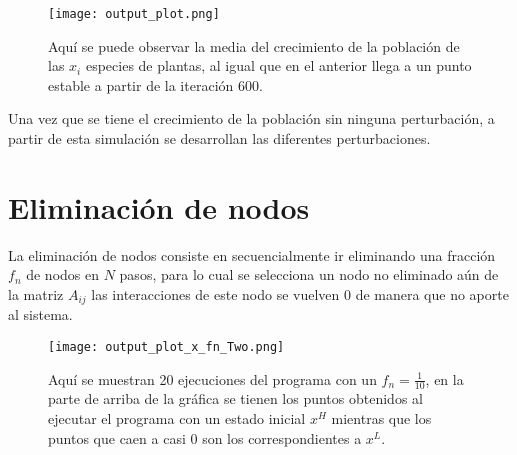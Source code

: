 \documentclass[11pt]{article}
\begin{document}
\begin{figure}[H]
\label{fig-sol}
\texttt{[image: output\_plot.png]}
\caption{Aquí se puede observar la media del crecimiento de la población de las $x_{i}$ especies de plantas, al igual que en el anterior llega a un punto estable a partir de la iteración 600.}
\end{figure}

Una vez que se tiene el crecimiento de la población sin ninguna perturbación, a partir de esta simulación se desarrollan las diferentes perturbaciones.

\section{Eliminación de nodos}


La eliminación de nodos consiste en secuencialmente ir eliminando una fracción $f_{n}$ de nodos en $N$ pasos, para lo cual se selecciona un nodo no eliminado aún de la matriz $A_{ij}$ las interacciones de este nodo se vuelven 0 de manera que no aporte al sistema.
\begin{figure}[H]
     \label{fig-n-del}
     \texttt{[image: output\_plot\_x\_fn\_Two.png]}
     \caption{Aquí se muestran 20 ejecuciones del programa con un $f_{n}=\frac{1}{10}$, en la parte de arriba de la gráfica se tienen los puntos obtenidos al ejecutar el programa con un estado inicial $x^{H}$ mientras que los puntos que caen a casi 0 son los correspondientes a $x^{L}$.}
     \end{figure}


 
\end{document}
